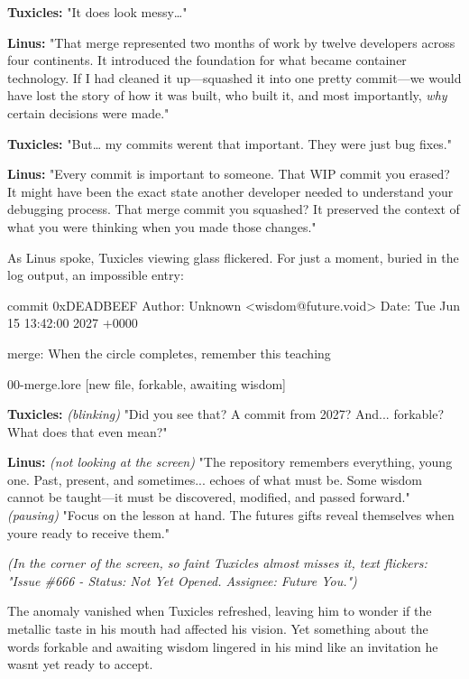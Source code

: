 \textbf{Tuxicles:} "It does look messy\ldots"

\textbf{Linus:} "That merge represented two months of work by twelve developers across four continents. It introduced the foundation for what became container technology. If I had \textquotesingle cleaned it up\textquotesingle---squashed it into one pretty commit---we would have lost the story of how it was built, who built it, and most importantly, \emph{why} certain decisions were made."

\textbf{Tuxicles:} "But\ldots{} my commits weren\textquotesingle t that important. They were just bug fixes."

\textbf{Linus:} "Every commit is important to someone. That WIP commit you erased? It might have been the exact state another developer needed to understand your debugging process. That merge commit you squashed? It preserved the context of what you were thinking when you made those changes."

As Linus spoke, Tuxicles\textquotesingle{} viewing glass flickered. For just a moment, buried in the log output, an impossible entry:

\begin{codeblock}
commit 0xDEADBEEF
Author: Unknown <wisdom@future.void>
Date:   Tue Jun 15 13:42:00 2027 +0000

    merge: When the circle completes, remember this teaching
    
    00-merge.lore [new file, forkable, awaiting wisdom]
\end{codeblock}

\textbf{Tuxicles:} \emph{(blinking)} "Did you see that? A commit from 2027? And... \textquotesingle forkable\textquotesingle? What does that even mean?"

\textbf{Linus:} \emph{(not looking at the screen)} "The repository remembers everything, young one. Past, present, and sometimes... echoes of what must be. Some wisdom cannot be taught---it must be discovered, modified, and passed forward." \emph{(pausing)} "Focus on the lesson at hand. The future\textquotesingle s gifts reveal themselves when you\textquotesingle re ready to receive them."

\emph{(In the corner of the screen, so faint Tuxicles almost misses it, text flickers: "Issue \#666 - Status: Not Yet Opened. Assignee: Future You.")}

The anomaly vanished when Tuxicles refreshed, leaving him to wonder if the metallic taste in his mouth had affected his vision. Yet something about the words \textquotesingle forkable\textquotesingle{} and \textquotesingle awaiting wisdom\textquotesingle{} lingered in his mind like an invitation he wasn\textquotesingle t yet ready to accept.

